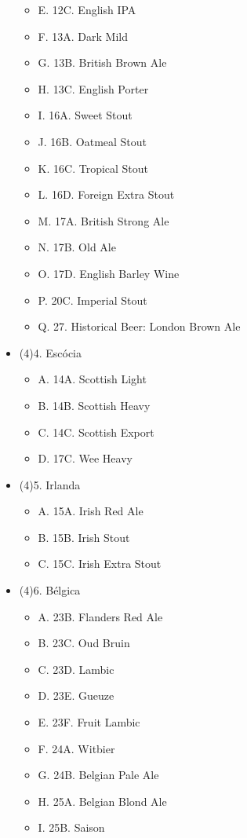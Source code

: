 \begin{multicols*}{2}
\begin{itemize}[noitemsep]
\begin{itemize}
  \item[] E. 12C. English IPA
  \item[] F. 13A. Dark Mild
  \item[] G. 13B. British Brown Ale
  \item[] H. 13C. English Porter
  \item[] I. 16A. Sweet Stout
  \item[] J. 16B. Oatmeal Stout
  \item[] K. 16C. Tropical Stout
  \item[] L. 16D. Foreign Extra Stout
  \item[] M. 17A. British Strong Ale
  \item[] N. 17B. Old Ale
  \item[] O. 17D. English Barley Wine
  \item[] P. 20C. Imperial Stout
  \item[] Q. 27. Historical Beer: London Brown Ale
\end{itemize}
\item[] (4)4. Escócia
\begin{itemize}
  \item[] A. 14A. Scottish Light
  \item[] B. 14B. Scottish Heavy
  \item[] C. 14C. Scottish Export
  \item[] D. 17C. Wee Heavy
\end{itemize}
\item[] (4)5. Irlanda
\begin{itemize}
  \item[] A. 15A. Irish Red Ale
  \item[] B. 15B. Irish Stout
  \item[] C. 15C. Irish Extra Stout
\end{itemize}
\item[] (4)6. Bélgica
\begin{itemize}
  \item[] A. 23B. Flanders Red Ale
  \item[] B. 23C. Oud Bruin
  \item[] C. 23D. Lambic
  \item[] D. 23E. Gueuze
  \item[] E. 23F. Fruit Lambic
  \item[] F. 24A. Witbier
  \item[] G. 24B. Belgian Pale Ale
  \item[] H. 25A. Belgian Blond Ale
  \item[] I. 25B. Saison

\end{itemize}
\end{itemize}
\end{multicols*}
